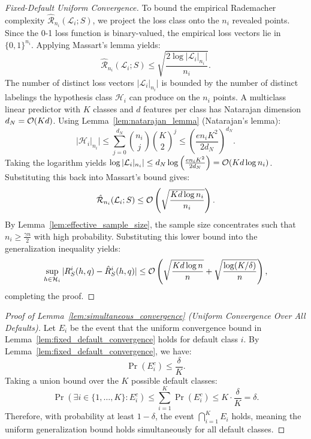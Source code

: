 \begin{proof}[Fixed-Default Uniform Convergence]
To bound the empirical Rademacher complexity $\hat{\mathcal{R}}_{n_i}(\mathcal{L}_i; S)$, we project the loss class onto the $n_i$ revealed points. Since the 0-1 loss function is binary-valued, the empirical loss vectors lie in $\{0, 1\}^{n_i}$. Applying Massart's lemma yields:
\begin{equation}
    \hat{\mathcal{R}}_{n_i}(\mathcal{L}_i; S) \le \sqrt{\frac{2\log|\mathcal{L}_i|_{n_i}|}{n_i}}.
\end{equation}
The number of distinct loss vectors $|\mathcal{L}_i|_{n_i}|$ is bounded by the number of distinct labelings the hypothesis class $\mathcal{H}_i$ can produce on the $n_i$ points. A multiclass linear predictor with $K$ classes and $d$ features per class has Natarajan dimension $d_N = \mathcal{O}(K d)$. Using Lemma~\ref{lem:natarajan_lemma} (Natarajan's lemma):
\begin{equation}
    |\mathcal{H}_i|_{n_i}| \le \sum_{j=0}^{d_N} \binom{n_i}{j}\binom{K}{2}^j \le \left( \frac{e n_i K^2}{2d_N} \right)^{d_N}.
\end{equation}
Taking the logarithm yields $\log |\mathcal{L}_i|_{n_i}| \le d_N \log\left( \frac{e n_i K^2}{2d_N} \right) = \mathcal{O}(K d \log n_i)$. Substituting this back into Massart's bound gives:
\begin{equation}
    \hat{\mathcal{R}}_{n_i}(\mathcal{L}_i; S) \le \mathcal{O}\left( \sqrt{\frac{K d \log n_i}{n_i}} \right).
\end{equation}
By Lemma~\ref{lem:effective_sample_size}, the sample size concentrates such that $n_i \ge \frac{\gamma n}{2}$ with high probability. Substituting this lower bound into the generalization inequality yields:
\begin{equation}
    \sup_{h \in \mathcal{H}_i} |R^i_S(h, q) - \hat{R}^i_S(h, q)| \le \mathcal{O}\left( \sqrt{\frac{K d \log n}{n}} + \sqrt{\frac{\log(K/\delta)}{n}} \right),
\end{equation}
completing the proof.
\end{proof}

\label{app:proof_simultaneous_convergence}
\begin{proof}[Proof of Lemma~\ref{lem:simultaneous_convergence} (Uniform Convergence Over All Defaults)]
Let $E_i$ be the event that the uniform convergence bound in Lemma~\ref{lem:fixed_default_convergence} holds for default class $i$. By Lemma~\ref{lem:fixed_default_convergence}, we have:
\begin{equation}
    \Pr(E_i^c) \le \frac{\delta}{K}.
\end{equation}
Taking a union bound over the $K$ possible default classes:
\begin{equation}
    \Pr\left( \exists i \in \{1, \dots, K\} : E_i^c \right) \le \sum_{i=1}^K \Pr(E_i^c) \le K \cdot \frac{\delta}{K} = \delta.
\end{equation}
Therefore, with probability at least $1 - \delta$, the event $\bigcap_{i=1}^K E_i$ holds, meaning the uniform generalization bound holds simultaneously for all default classes.
\end{proof}

